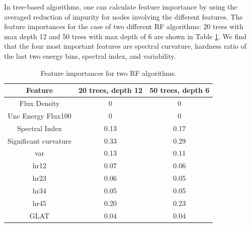 In tree-based algorithms, one can calculate feature importance by using the averaged reduction of impurity for nodes involving the different features. The feature importances for the case of two different RF algorithms: 20 trees with max depth 12 and 50 trees with max depth of 6 are shown in Table \ref{tab:feat_imp}.
We find that the four most important features are spectral curvature, hardness ratio of the last two energy bins, spectral index, and variability.


\begin{table}[!h]
    \tiny
    \centering
    \renewcommand{\tabcolsep}{1mm}
\renewcommand{\arraystretch}{1}

    \begin{tabular}{|c|c|c|}
    \hline
    Feature &  20 trees, depth 12& 50 trees, depth 6\\
    \hline
    Flux Density& 0 & 0        \\
    \hline
    Unc Energy Flux100& 0     & 0 \\
    \hline %
   Spectral Index & 0.13     &   0.17 \\
    \hline %
    Significant curvature& 0.33 &0.29  \\
    \hline
   var&  0.13   &  0.11  \\
    \hline %
    hr12& 0.07 &0.06 \\
    \hline
     hr23& 0.06 &0.05 \\
    \hline
    hr34& 0.05 &0.05 \\
    \hline
   hr45& 0.20 &0.23 \\
    \hline
    GLAT&0.04&0.04\\
    \hline
    \end{tabular}

    \caption{Feature importances for two RF algorithms.}
    \label{tab:feat_imp}
\end{table}


